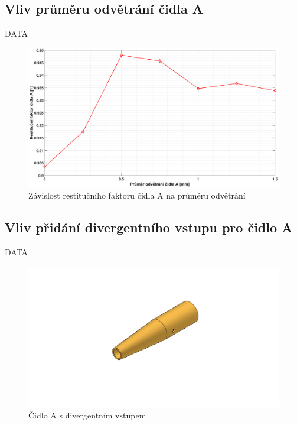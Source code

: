     \newpage
    \subsection{Vliv průměru odvětrání čidla A}
        DATA
        
        \begin{figure}[ht!]
            \centering
            \includegraphics*[width=\textwidth, trim={5.25cm 1.0cm 5.8cm 2.0cm}]{400_SIMULACE_KONSTRUKCNICH_UPRAV/Grafy/07_prumer_odvetrani_A.eps}
            \caption{Závislost restitučního faktoru čidla A na průměru odvětrání}
            \label{fig:prumer-odvetrani-A}
        \end{figure}
    
    \newpage
    \subsection{Vliv přidání divergentního vstupu pro čidlo A}
        DATA
        
        \begin{figure}[ht!]
            \centering
            \includegraphics[width=\textwidth]{400_SIMULACE_KONSTRUKCNICH_UPRAV/Vykresy_rendery/Difuzor_A.png}
            \caption{Čidlo A s divergentním vstupem}
            \label{fig:difuzor-A}
        \end{figure}
    
